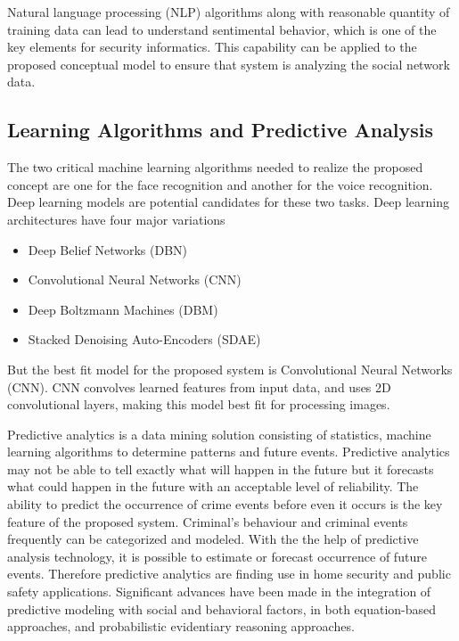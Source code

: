 \documentclass[sigconf]{acmart}
\begin{document}
Natural language processing (NLP) algorithms along with reasonable quantity of training data can lead to understand sentimental behavior, which is one of the key elements for security informatics. This capability can be applied to the proposed conceptual model to ensure that system is analyzing the social network data.

\subsection{Learning Algorithms and Predictive Analysis}
The two critical machine learning algorithms needed to realize the proposed concept are one for the face recognition and another for the voice recognition. Deep learning models are potential candidates for these two tasks. Deep learning architectures have four major variations 
\begin{itemize}
 \item Deep Belief Networks (DBN)\cite{Hinton2009}
 \item Convolutional Neural Networks (CNN)\cite{NIPS2012-4824}
 \item Deep Boltzmann Machines (DBM)\cite{pmlr-v9-salakhutdinov10a} 
 \item Stacked Denoising Auto-Encoders (SDAE)\cite{Vincent2010}
 \end{itemize}
 But the best fit model for the proposed system is Convolutional Neural Networks (CNN). CNN convolves learned features from input data, and uses 2D convolutional layers, making this model best fit for processing images.

Predictive analytics is a data mining solution consisting of statistics, machine learning algorithms to determine patterns and future events. Predictive analytics may not be able to tell exactly what will happen in the future but it forecasts what could happen in the future with an acceptable level of reliability. The ability to predict the occurrence of crime events before even it occurs is the key feature of the proposed system. Criminal's behaviour and criminal events frequently can be categorized and modeled. With the the help of predictive analysis technology, it is possible to estimate or forecast occurrence of future events. Therefore predictive analytics are finding use in home security and public safety applications. Significant advances have been made in the integration of predictive modeling with social and behavioral factors, in both equation-based approaches, and probabilistic evidentiary reasoning approaches\cite{Sanfilippo2012}. 
\end{document}
